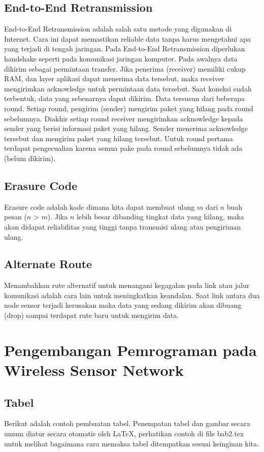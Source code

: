 \subsection{End-to-End Retransmission}
End-to-End Retransmission adalah salah satu metode yang digunakan di Internet. Cara ini dapat memastikan reliable data tanpa harus mengetahui apa yang terjadi di tengah jaringan. Pada End-to-End Retransmission diperlukan handshake seperti pada komunikasi jaringan komputer. Pada awalnya data dikirim sebagai permintaan transfer. Jika penerima (receiver) memiliki cukup RAM, dan layer aplikasi dapat menerima data tersebut, maka receiver mengirimkan acknowledge untuk permintaan data tersebut. Saat koneksi sudah terbentuk, data yang sebenarnya dapat dikirim. Data tersusun dari beberapa round. Setiap round, pengirim (sender) mengirim paket yang hilang pada round sebelumnya. Diakhir setiap  round receiver mengirimkan acknowledge kepada sender yang berisi informasi paket yang hilang. Sender menerima acknowledge tersebut dan mengirim paket yang hilang tersebut. Untuk round pertama terdapat pengecualian karena semua pake pada round sebelumnya tidak ada (belum dikirim). 

\subsection{Erasure Code}
Erasure code adalah kode dimana kita dapat membuat ulang $m$ dari $n$ buah pesan ($n$ > $m$). Jika $n$ lebih besar dibanding tingkat data yang hilang, maka akan didapat reliabilitas yang tinggi tanpa transmisi ulang atau pengiriman ulang. 

\subsection{Alternate Route}
Menambahkan rute alternatif untuk menangani kegagalan pada link atau jalur komunikasi adalah cara lain untuk meningkatkan keandalan. Saat link antara dua node sensor terjadi kerusakan maka data yang sedang dikirim akan dibuang (drop) sampai terdapat rute baru untuk mengirim data.



\section{Pengembangan Pemrograman pada Wireless Sensor Network}
\label{sec:pemrograman_wsn}


\newpage
\subsection{Tabel}  
Berikut adalah contoh pembuatan tabel. 
Penempatan tabel dan gambar secara umum diatur secara otomatis oleh \LaTeX{}, perhatikan contoh di file bab2.tex untuk melihat bagaimana cara memaksa tabel ditempatkan sesuai keinginan kita.


